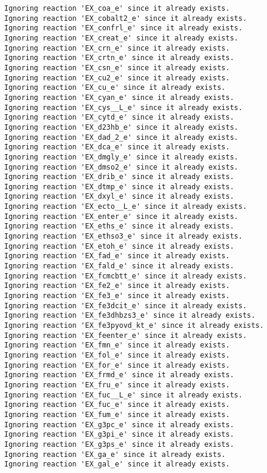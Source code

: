 \documentclass[
  letterpaper,
  DIV=11,
  numbers=noendperiod]{scrartcl}
\begin{document}
\begin{verbatim}
Ignoring reaction 'EX_coa_e' since it already exists.
Ignoring reaction 'EX_cobalt2_e' since it already exists.
Ignoring reaction 'EX_confrl_e' since it already exists.
Ignoring reaction 'EX_creat_e' since it already exists.
Ignoring reaction 'EX_crn_e' since it already exists.
Ignoring reaction 'EX_crtn_e' since it already exists.
Ignoring reaction 'EX_csn_e' since it already exists.
Ignoring reaction 'EX_cu2_e' since it already exists.
Ignoring reaction 'EX_cu_e' since it already exists.
Ignoring reaction 'EX_cyan_e' since it already exists.
Ignoring reaction 'EX_cys__L_e' since it already exists.
Ignoring reaction 'EX_cytd_e' since it already exists.
Ignoring reaction 'EX_d23hb_e' since it already exists.
Ignoring reaction 'EX_dad_2_e' since it already exists.
Ignoring reaction 'EX_dca_e' since it already exists.
Ignoring reaction 'EX_dmgly_e' since it already exists.
Ignoring reaction 'EX_dmso2_e' since it already exists.
Ignoring reaction 'EX_drib_e' since it already exists.
Ignoring reaction 'EX_dtmp_e' since it already exists.
Ignoring reaction 'EX_dxyl_e' since it already exists.
Ignoring reaction 'EX_ecto__L_e' since it already exists.
Ignoring reaction 'EX_enter_e' since it already exists.
Ignoring reaction 'EX_eths_e' since it already exists.
Ignoring reaction 'EX_ethso3_e' since it already exists.
Ignoring reaction 'EX_etoh_e' since it already exists.
Ignoring reaction 'EX_fad_e' since it already exists.
Ignoring reaction 'EX_fald_e' since it already exists.
Ignoring reaction 'EX_fcmcbtt_e' since it already exists.
Ignoring reaction 'EX_fe2_e' since it already exists.
Ignoring reaction 'EX_fe3_e' since it already exists.
Ignoring reaction 'EX_fe3dcit_e' since it already exists.
Ignoring reaction 'EX_fe3dhbzs3_e' since it already exists.
Ignoring reaction 'EX_fe3pyovd_kt_e' since it already exists.
Ignoring reaction 'EX_feenter_e' since it already exists.
Ignoring reaction 'EX_fmn_e' since it already exists.
Ignoring reaction 'EX_fol_e' since it already exists.
Ignoring reaction 'EX_for_e' since it already exists.
Ignoring reaction 'EX_frmd_e' since it already exists.
Ignoring reaction 'EX_fru_e' since it already exists.
Ignoring reaction 'EX_fuc__L_e' since it already exists.
Ignoring reaction 'EX_fuc_e' since it already exists.
Ignoring reaction 'EX_fum_e' since it already exists.
Ignoring reaction 'EX_g3pc_e' since it already exists.
Ignoring reaction 'EX_g3pi_e' since it already exists.
Ignoring reaction 'EX_g3ps_e' since it already exists.
Ignoring reaction 'EX_ga_e' since it already exists.
Ignoring reaction 'EX_gal_e' since it already exists.

\end{verbatim}
\end{document}
